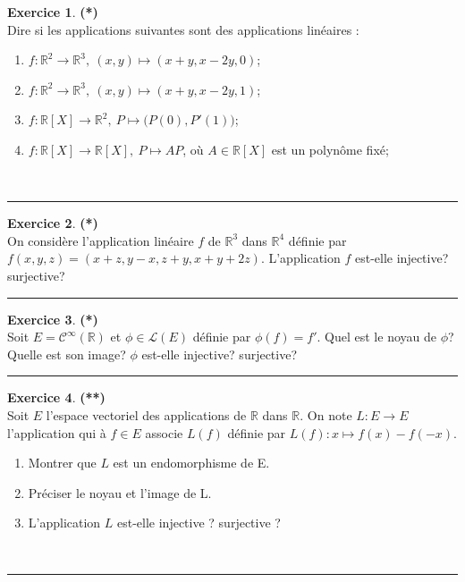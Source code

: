 \documentclass[a4paper,11pt]{article}
\theoremstyle{definition}
\newtheorem{exo}{Exercice} %
\begin{document}
    
\begin{minipage}{1\linewidth}\begin{minipage}[t]{0.48\linewidth}\raggedright

\begin{exo}\textbf{(*)}\quad\\[0.2cm]
Dire si les applications suivantes sont des applications linéaires :
\begin{enumerate}
	\item $f:\mathbb R^2\to\mathbb R^3,\ (x,y)\mapsto (x+y,x-2y,0)$;
	\item $f:\mathbb R^2\to\mathbb R^3,\ (x,y)\mapsto (x+y,x-2y,1)$;
	\item $f:\mathbb R[X]\to \mathbb R^2,\ P\mapsto \big(P(0),P'(1)\big)$;
	\item $f:\mathbb R[X]\to \mathbb R[X],\ P\mapsto AP$, où $A\in\mathbb R[X]$ est un polynôme fixé;
\end{enumerate}
\hfill\\[-0.25cm]
\centering\rule{1\linewidth}{0.6pt}\end{exo}


\begin{exo}\textbf{(*)}\quad\\[0.2cm]
On considère l'application linéaire $f$ de $\mathbb R^3$
dans $\mathbb R^4$ définie par $f(x,y,z)=(x+z,y-x,z+y,x+y+2z).$
L'application $f$ est-elle injective? surjective?
\hfill\\[-0.25cm]
\centering\rule{1\linewidth}{0.6pt}\end{exo}


\begin{exo}\textbf{(*)}\quad\\[0.2cm]
Soit $E=\mathcal C^{\infty}(\mathbb R)$ et $\phi\in\mathcal L(E)$ définie par $\phi(f)=f'$. Quel est le noyau de $\phi$? Quelle est son image? $\phi$ est-elle injective? surjective?
\hfill\\[-0.25cm]
\centering\rule{1\linewidth}{0.6pt}\end{exo}


\begin{exo}\textbf{(**)}\quad\\[0.2cm]
Soit $E$ l’espace vectoriel des applications de $\mathbb R$ dans $\mathbb R$. On note $L:E\to E$ l’application qui à $f\in E$ associe $L(f)$ définie par $L(f):x\mapsto f(x)-f(-x)$.
\begin{enumerate}
	\item Montrer que $L$ est un endomorphisme de E.
	\item Préciser le noyau et l’image de L.
	\item L’application $L$ est-elle injective ? surjective ?
\end{enumerate}
\hfill\\[-0.25cm]
\centering\rule{1\linewidth}{0.6pt}\end{exo}


\end{minipage}
\end{minipage}
\end{document}
